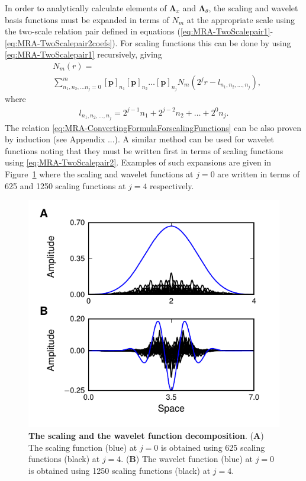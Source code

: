 \documentclass[review,authoryear,3p]{elsarticle}
\begin{document}
In order to analytically calculate elements of $\boldsymbol\Lambda_{x}$ and $\boldsymbol\Lambda_{\theta}$, the scaling and wavelet basis functions must be expanded in terms of $N_m$ at the appropriate scale using the two-scale relation pair defined in equations (\ref{eq:MRA-TwoScalepair1}-\ref{eq:MRA-TwoScalepair2coefs}). For scaling functions this can be done  by using \eqref{eq:MRA-TwoScalepair1} recursively, giving
\begin{align}\label{eq:MRA-ConvertingFormulaForscalingFunctions}
 &N_m(r)=\nonumber \\
&\sum_{n_1,n_2, \dots n_j=0}^{m}\left[\mathbf p\right]_{n_1} \left[\mathbf p\right]_{n_2}\dots \left[\mathbf p\right]_{n_j}N_m(2^jr-l_{n_1,n_2, \dots, n_j}),
\end{align}
where 
\begin{align}
 l_{n_1,n_2, \dots, n_j}=2^{j-1}n_1+2^{j-2}n_2+ \dots +2^{0}n_j.
\end{align}
The relation \eqref{eq:MRA-ConvertingFormulaForscalingFunctions} can be also proven by induction (see Appendix ...). A similar method can be used for wavelet functions noting that they must be written first in terms of scaling functions using \eqref{eq:MRA-TwoScalepair2}. Examples of such expansions are given in Figure~\ref{fig:MRA-BasisDecomposition} where the scaling and wavelet functions at $j=0$ are written in terms of 625 and 1250 scaling functions at $j=4$ respectively.
\begin{figure}[!t] 
 	\centering
 		\includegraphics[scale=1]{./Graph/Decomposition.pdf}
 		\caption{{\bf The scaling and the wavelet function decomposition}. (\textbf{A}) The scaling function (blue) at $j=0$ is obtained using 625 scaling functions (black) at $j=4$. (\textbf{B}) The wavelet function (blue) at $j=0$ is obtained using 1250 scaling functions (black) at $j=4$.}
 	\label{fig:MRA-BasisDecomposition}
 \end{figure}  
\end{document}

